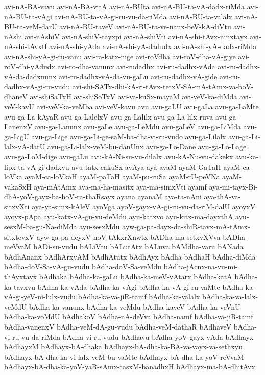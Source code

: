 {avi-nA-BA-vavu
avi-nA-BA-vitA
avi-nA-BUta
avi-nA-BU-ta-vA-dadx-riMda
avi-nA-BU-ta-vAgi
avi-nA-BU-ta-vA-gi-ru-vu-da-riMda
avi-nA-BU-ta-valalx
avi-nA-BU-ta-veM-darU
avi-nA-BU-taveV
avi-nA-BU-ta-ve-nanx-beV-kA-diVtu
avi-nAshi
avi-nAshiV
avi-nA-shiV-tayxpi
avi-nA-shiVti
avi-nA-shi-tAvx-ninxtayx
avi-nA-shi-tAvxtf
avi-nA-shi-yAda
avi-nA-shi-yA-dadudx
avi-nA-shi-yA-dadx-riMda
avi-nA-shi-yA-gi-ru-vanu
avi-ra-katx-nige
avi-roVdha
avi-roV-dha-vA-giye
avi-roV-dhi-yAdudx
avi-ro-dha-vanunx
avi-rudadhx
avi-ru-dadhx-vAda
avi-ru-dadhx-vA-da-dadxnunx
avi-ru-dadhx-vA-da-vu-gaLu
avi-ru-dadhx-vA-gide
avi-ru-dadhx-vA-gi-ru-vudu
avi-shi-SATx-dhi-kA-ri-tAvx-tetxV-SA-mA-tAmx-va-boV-dhaneV
avi-shiSaTxH
avi-shiSoTxV
avi-va-kuSx-mayaM
avi-veV-ka-diMda
avi-veV-kavU
avi-veV-ka-veMba
avi-veV-kavu
avu
avu-gaLU
avu-gaLa
avu-ga-LaMte
avu-ga-La-kAyaR
avu-ga-LalelxV
avu-ga-Lalilx
avu-ga-La-lilx-ruva
avu-ga-LanenxV
avu-ga-Lanunx
avu-gaLe
avu-ga-LeMdu
avu-gaLeV
avu-ga-LiMda
avu-ga-LigU
avu-ga-Lige
avu-ga-Li-ge-saM-ba-dha-vi-ru-vudo
avu-ga-Lilalx
avu-ga-Li-lalx-vA-darU
avu-ga-Li-lalx-veM-bu-danUnx
avu-ga-Lo-Dane
avu-ga-Lo-Lage
avu-ga-LoM-dige
avu-gaLu
avu-kA-Ni-su-vu-dilalx
avu-kA-Nu-vu-dakekx
avu-ka-lipx-ta-vA-gi-dadxvu
avu-tatx-cakuSx
ayAya
aya
ayaM
ayaM-GaTaH
ayaM-ca-loVka
ayaM-ca-loVkaH
ayaM-paTaH
ayaM-pu-ruSa
ayaM-rU-peVNa
ayaM-vakaSxH
aya-mAtAmx
aya-ma-ha-masitx
aya-ma-simxVti
ayamf
aya-mi-tayx-Bi-dhA-yoV-gayx-ba-hoV-ra-thaRsayx
ayana
ayanaM
aya-ta-nAni
aya-thA-va-sitxvXti
aya-ya-simx-kAleV
ayoVga
ayoV-gayx-vA-gi-ru-vu-da-riM-dalU
ayoyxV
ayoyx-pApa
ayu-katx-vA-gu-vu-deMdu
ayu-katxvo
ayu-kitx-ma-dayxthA
ayu-sesxM-ba-gu-Na-diMda
ayu-sesxMdu
ayw-ga-pa-dayx-da-shiR-tavx-mA-tAmx-sitxtevxV
ayw-ga-pa-deyxV-noV-tAkxrXnwtx
bADha-ma-setxvXVva
bADha-meVvaM
bADi-su-vudu
bALiVtu
bALutAtx
bALuva
bAMdha-varu
bANada
bAdhAnanx
bAdhArxyAM
bAdhAtutx
bAdhAyx
bAdha
bAdhaH
bAdha-diMda
bAdha-doV-Sa-vA-gu-vudu
bAdha-doV-Sa-veMdu
bAdha-jAcnx-na-vu-mi-thAyxtavx
bAdhaka
bAdha-ka-gaLu
bAdha-ka-meV-vAtarx
bAdha-katA
bAdha-ka-tavxvu
bAdha-ka-vAda
bAdha-ka-vAgi
bAdha-ka-vA-gi-ru-vaMte
bAdha-ka-vA-gi-yeV-ni-lulx-vudu
bAdha-ka-va-jiR-tamf
bAdha-ka-valalx
bAdha-ka-va-lalx-veMdU
bAdha-ka-vanunx
bAdha-ka-veMdu
bAdha-kaveV
bAdha-ka-veVnU
bAdha-ka-voMdU
bAdhakoV
bAdha-nA-deVva
bAdha-namf
bAdha-va-jiR-tamf
bAdha-vanenxV
bAdha-veM-dA-gu-vudu
bAdha-veM-dathaR
bAdhaveV
bAdha-vi-ru-vu-da-riMda
bAdha-vi-ru-vudu
bAdhavu
bAdha-yoV-gayx-vAda
bAdhayx
bAdhayxM
bAdhayx-bA-dhaka
bAdhayx-bA-dha-ka-BA-va-vayx-va-sethxyu
bAdhayx-bA-dha-ka-vi-lalx-veM-bu-vaMte
bAdhayx-bA-dha-ka-yoV-reVvaM
bAdhayx-bA-dha-ka-yoV-yaR-sAmx-tasxM-banadhxH
bAdhayx-ma-bA-dhitAvx
}
